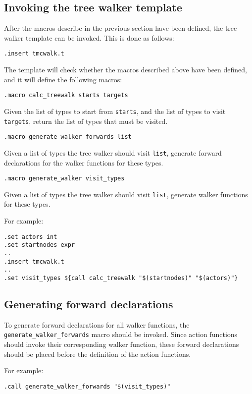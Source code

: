 \subsection{Invoking the tree walker template}
After the macros describe in the previous section have been defined,
the tree walker template can be invoked. This is done as follows:
\begin{verbatim}
.insert tmcwalk.t
\end{verbatim}
The template will check whether the macros described above have been
defined, and it will define the following macros:
\begin{verbatim}
.macro calc_treewalk starts targets
\end{verbatim}
\begin{desc}
Given the list of types to start from {\tt starts}, and the list of types
to visit {\tt targets}, return the list of types that must be visited.
\end{desc}
\begin{verbatim}
.macro generate_walker_forwards list
\end{verbatim}
\begin{desc}
Given a list of types the tree walker should visit {\tt list}, generate
forward declarations for the walker functions for these types. 
\end{desc}
\begin{verbatim}
.macro generate_walker visit_types
\end{verbatim}
\begin{desc}
Given a list of types the tree walker should visit {\tt list}, generate
walker functions for these types.
\end{desc}
For example:
\begin{verbatim}
.set actors int
.set startnodes expr
..
.insert tmcwalk.t
..
.set visit_types ${call calc_treewalk "$(startnodes)" "$(actors)"}
\end{verbatim}
\subsection{Generating forward declarations}
To generate forward declarations for all walker functions, the
\verb'generate_walker_forwards' macro should be invoked.
Since action functions should invoke their corresponding walker
function, these forward declarations should be placed before the
definition of the action functions.
\par
For example:
\begin{verbatim}
.call generate_walker_forwards "$(visit_types)"
\end{verbatim}
